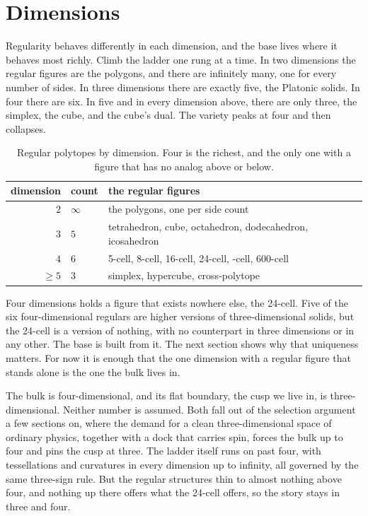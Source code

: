 \section{Dimensions}

Regularity behaves differently in each dimension, and the base lives where it behaves most richly. Climb the ladder one rung at a time. In two dimensions the regular figures are the polygons, and there are infinitely many, one for every number of sides. In three dimensions there are exactly five, the Platonic solids. In four there are six. In five and in every dimension above, there are only three, the simplex, the cube, and the cube's dual. The variety peaks at four and then collapses.

\begin{table}[ht]
\centering
\begin{tabular}{@{}rlp{}@{}}
\toprule
dimension & count & the regular figures \\
\midrule
$2$ & $\infty$ & the polygons, one per side count \\
$3$ & $5$ & tetrahedron, cube, octahedron, \newline dodecahedron, icosahedron \\
$4$ & $6$ & 5-cell, 8-cell, 16-cell, 24-cell, \newline 120-cell, 600-cell \\
$\geq 5$ & $3$ & simplex, hypercube, cross-polytope \\
\bottomrule
\end{tabular}
\caption{Regular polytopes by dimension. Four is the richest, and the only one with a figure that has no analog above or below.}
\label{tab:regular}
\end{table}

Four dimensions holds a figure that exists nowhere else, the 24-cell. Five of the six four-dimensional regulars are higher versions of three-dimensional solids, but the 24-cell is a version of nothing, with no counterpart in three dimensions or in any other. The base is built from it. The next section shows why that uniqueness matters. For now it is enough that the one dimension with a regular figure that stands alone is the one the bulk lives in.

The bulk is four-dimensional, and its flat boundary, the cusp we live in, is three-dimensional. Neither number is assumed. Both fall out of the selection argument a few sections on, where the demand for a clean three-dimensional space of ordinary physics, together with a dock that carries spin, forces the bulk up to four and pins the cusp at three. The ladder itself runs on past four, with tessellations and curvatures in every dimension up to infinity, all governed by the same three-sign rule. But the regular structures thin to almost nothing above four, and nothing up there offers what the 24-cell offers, so the story stays in three and four.

